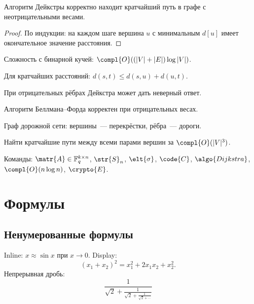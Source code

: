 \documentclass[font=modern]{cmcmsuthesis-master}
\begin{document}
\begin{theorem}\label{thm:dijkstra}
Алгоритм Дейкстры корректно находит кратчайший путь
в графе с неотрицательными весами.
\end{theorem}

\begin{proof}
По индукции: на каждом шаге вершина $u$ с минимальным
$d[u]$ имеет окончательное значение расстояния.
\end{proof}

\begin{corollary}\label{cor:complexity}
Сложность с бинарной кучей: $\compl{O}((|V|+|E|)\log|V|)$.
\end{corollary}

\begin{lemma}\label{lem:triangle}
Для кратчайших расстояний: $d(s,t)\leq d(s,u)+d(u,t)$.
\end{lemma}

\begin{proposition}\label{prop:negative}
При отрицательных рёбрах Дейкстра может дать неверный ответ.
\end{proposition}

\begin{remark}\label{rem:bellman}
Алгоритм Беллмана--Форда корректен при отрицательных весах.
\end{remark}

\begin{example}\label{ex:road}
Граф дорожной сети: вершины~--- перекрёстки, рёбра~--- дороги.
\end{example}

\begin{problem}\label{prob:allpairs}
Найти кратчайшие пути между всеми парами вершин
за $\compl{O}(|V|^3)$.
\end{problem}

Команды: $\matr{A}\in\mathbb{F}^{k\times n}_q$,
$\str{S}_n$, $\elt{\sigma}$, $\code{C}$,
$\algo{Dijkstra}$, $\compl{O}(n\log n)$, $\crypto{E}$.

\section{Формулы}\label{sec:formulas}

\subsection{Ненумерованные формулы}
Inline: $x\approx\sin x$ при $x\to 0$.
Display: \[(x_1+x_2)^2=x_1^2+2x_1x_2+x_2^2.\]
Непрерывная дробь:
\[\frac{1}{\sqrt{2}+\displaystyle\frac{1}{\sqrt{2}+\displaystyle\frac{1}{\sqrt{2}+\cdots}}}\]
\end{document}
